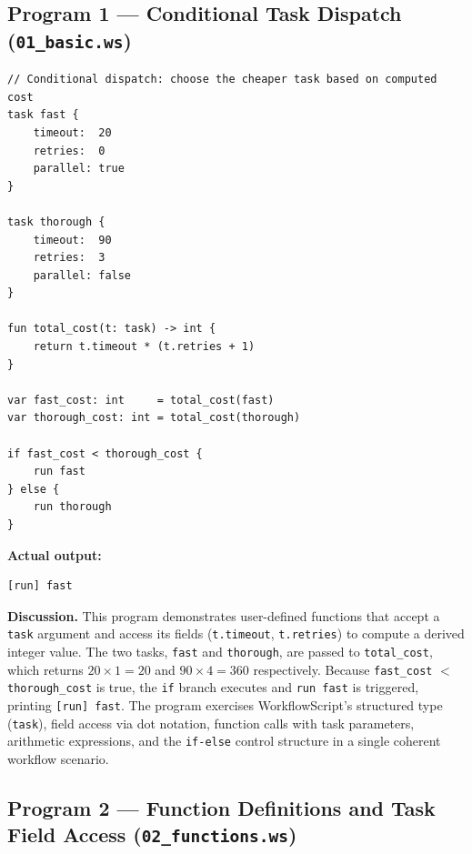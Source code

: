 \documentclass[10pt,a4paper]{article}
\begin{document}
\subsection{Program 1 --- Conditional Task Dispatch (\texttt{01\_basic.ws})}

\begin{lstlisting}[caption={01\_basic.ws --- conditional dispatch based on task cost}]
// Conditional dispatch: choose the cheaper task based on computed cost
task fast {
    timeout:  20
    retries:  0
    parallel: true
}

task thorough {
    timeout:  90
    retries:  3
    parallel: false
}

fun total_cost(t: task) -> int {
    return t.timeout * (t.retries + 1)
}

var fast_cost: int     = total_cost(fast)
var thorough_cost: int = total_cost(thorough)

if fast_cost < thorough_cost {
    run fast
} else {
    run thorough
}
\end{lstlisting}

\noindent\textbf{Actual output:}
\begin{lstlisting}[style=output]
[run] fast
\end{lstlisting}

\noindent\textbf{Discussion.}
This program demonstrates user-defined functions that accept a \texttt{task} argument and
access its fields (\texttt{t.timeout}, \texttt{t.retries}) to compute a derived integer
value.
The two tasks, \texttt{fast} and \texttt{thorough}, are passed to \texttt{total\_cost},
which returns $20 \times 1 = 20$ and $90 \times 4 = 360$ respectively.
Because \texttt{fast\_cost} $<$ \texttt{thorough\_cost} is true, the \texttt{if} branch
executes and \texttt{run fast} is triggered, printing \texttt{[run] fast}.
The program exercises WorkflowScript's structured type (\texttt{task}), field access via
dot notation, function calls with task parameters, arithmetic expressions, and the
\texttt{if-else} control structure in a single coherent workflow scenario.

\subsection{Program 2 --- Function Definitions and Task Field Access (\texttt{02\_functions.ws})}
\end{document}
